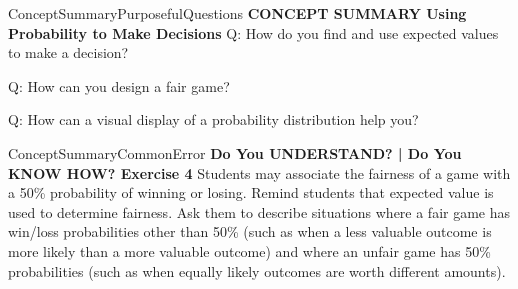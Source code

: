 \documentclass{article}
\newenvironment{te-addendum}[2]{}{}     %
\newcommand{\answer}[1]{}               %
\newcommand{\te}[1]{}                   %
\begin{document}
\begin{te-addendum}{ConceptSummary}{PurposefulQuestions}
\textbf{CONCEPT SUMMARY Using Probability to Make Decisions}
Q: How do you find and use expected values to make a decision?
\answer{Use simple or binomial probability to find expected values. Compare the expected values to choose the more favorable outcome.}
Q: How can you design a fair game?
\answer{Make it so the expected value to a single player is zero or the expected value to each player is equal.}
Q: How can a visual display of a probability distribution help you?
\answer{You can see how many ways each outcome can occur before finding binomial probabilities.}
\te{Presentation; Practice. Concept Summary, Do You Understand, and Do You Know How are available at SavvasRealize.com.}
\end{te-addendum}
\begin{te-addendum}{ConceptSummary}{CommonError}
\textbf{Do You UNDERSTAND? | Do You KNOW HOW? Exercise 4}
Students may associate the fairness of a game with a 50\% probability of winning or losing. Remind students that expected value is used to determine fairness. Ask them to describe situations where a fair game has win/loss probabilities other than 50\% (such as when a less valuable outcome is more likely than a more valuable outcome) and where an unfair game has 50\% probabilities (such as when equally likely outcomes are worth different amounts).
\end{te-addendum}
\end{document}
